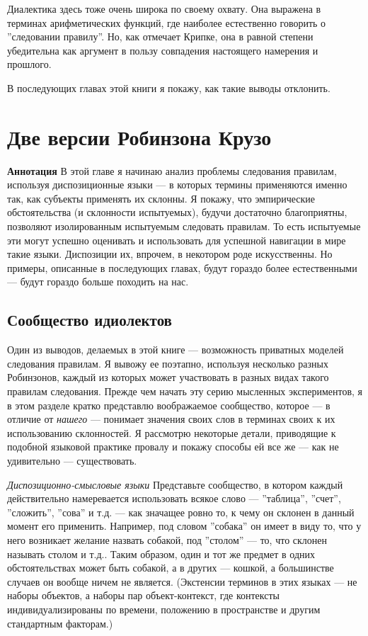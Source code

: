 \documentclass[11pt]{book}
\begin{document}
Диалектика здесь тоже очень широка по своему охвату. Она выражена в терминах арифметических функций, где наиболее естественно говорить о ''следовании правилу''. Но, как отмечает Крипке, она в равной степени убедительна как аргумент в пользу совпадения настоящего намерения и прошлого.

В последующих главах этой книги я покажу, как такие выводы отклонить.

\chapter{Две версии Робинзона Крузо}

\qquad

\textbf{Аннотация} \quad В этой главе я начинаю анализ проблемы следования правилам, используя диспозиционные языки --- в которых термины применяются именно так, как субъекты применять их склонны. Я покажу, что эмпирические обстоятельства (и склонности испытуемых), будучи достаточно благоприятны, позволяют изолированным испытуемым следовать правилам. То есть испытуемые эти могут успешно оценивать и использовать для успешной навигации в мире такие языки. Диспозиции их, впрочем, в некотором роде искусственны. Но примеры, описанные в последующих главах, будут гораздо более естественными --- будут гораздо больше походить на нас.

\qquad

\section{Сообщество идиолектов}

Один из выводов, делаемых в этой книге --- возможность приватных моделей следования правилам. Я вывожу ее поэтапно, используя несколько разных Робинзонов, каждый из которых может участвовать в разных видах такого правилам следования. Прежде чем начать эту серию мысленных экспериментов, я в этом разделе кратко представлю воображаемое сообщество, которое --- в отличие от \textit{нашего} --- понимает значения своих слов в терминах своих к их использованию склонностей. Я рассмотрю некоторые детали, приводящие к подобной языковой практике провалу и покажу способы ей все же --- как не удивительно --- существовать.

\textit{Диспозиционно-смысловые языки} \quad Представьте сообщество, в котором каждый действительно намеревается использовать всякое слово --- ''таблица'', ''счет'', ''сложить'', ''сова'' и т.д. --- как значащее ровно то, к чему он склонен в данный момент его применить. Например, под словом ''собака'' он имеет в виду то, что у него возникает желание назвать собакой, под ''столом'' --- то, что склонен называть столом и т.д.. Таким образом, один и тот же предмет в одних обстоятельствах может быть собакой, а в других --- кошкой, а большинстве случаев он вообще ничем не является. (Экстенсии терминов в этих языках --- не наборы объектов, а наборы пар объект-контекст, где контексты индивидуализированы по времени, положению в пространстве и другим стандартным факторам.)
\end{document}
